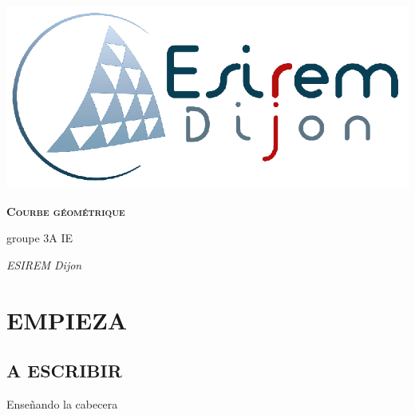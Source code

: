 \documentclass[11pt]{report}
\newcommand\blankpage{%
    \null
    \thispagestyle{empty}%
    \addtocounter{page}{-1}%
    \newpage}
\newcommand{\titulo}{\color{blue}Courbe géométrique}
\newcommand{\autor}{groupe 3A IE}
\newcommand{\fecha}{ESIREM Dijon}
\begin{document}
    \cfoot{\thepage}
    
    \begin{titlepage}
        \reversemarginpar{}
        
        {\centering
            \vspace{3cm} %
            \hspace{5cm} \includegraphics[width=.4\textwidth]{figs/Logo_Esirem.png} %
            \par\vspace{5cm}
            {\scshape\huge\textbf{\hspace{2cm}\titulo}} \par\vspace{6cm}
            
            {\LARGE
            \begin{flushright}
                    \item \autor 
                    \item \textit{\fecha}
            \end{flushright}
            }
        }
    \end{titlepage}

    \afterpage{\blankpage}
    
\begingroup
    \tableofcontents
\endgroup    
    \newpage
    \chapter{EMPIEZA}
        \section{A ESCRIBIR}
            \newpage Enseñando la cabecera
            
\end{document}
